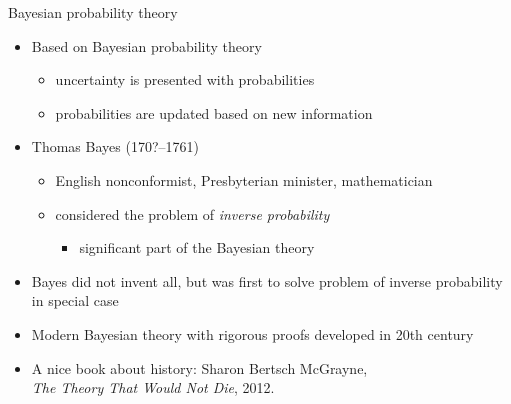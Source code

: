 \documentclass[english,t]{beamer}
\begin{document}
\begin{frame}{Bayesian probability theory}

  \begin{itemize}
  \item Based on Bayesian probability theory
    \begin{itemize}
    \item uncertainty is presented with probabilities
    \item probabilities are updated based on new information
    \end{itemize}
    \item Thomas Bayes (170?--1761)
    \begin{itemize}
    \item English nonconformist, Presbyterian minister,
      mathematician
    \item considered the problem of {\it inverse probability}
      \begin{itemize}
        \item significant part of the Bayesian theory
      \end{itemize}
  \end{itemize}
  \pause
  \item Bayes did not invent all, but was first to solve problem of
    inverse probability in special case
  \item Modern Bayesian theory with rigorous proofs developed in
    20th century
    \pause
  \item A nice book about history: Sharon Bertsch McGrayne,\\
    \textit{The Theory That Would Not Die}, 2012.
\end{itemize}
\end{frame}
\end{document}
